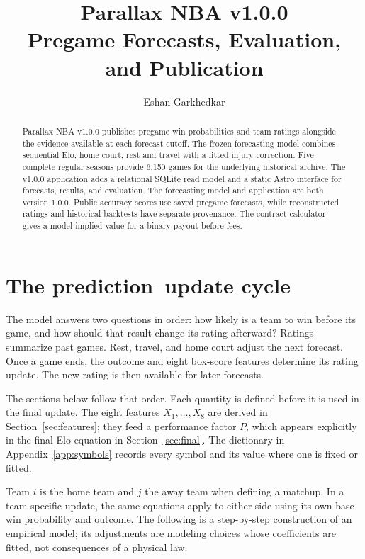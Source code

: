 \documentclass[11pt]{article}
\title{Parallax NBA v1.0.0\\
\large Pregame Forecasts, Evaluation, and Publication}
\author{Eshan Garkhedkar}
\date{}
\begin{document}
\maketitle
\begin{abstract}
Parallax NBA v1.0.0 publishes pregame win probabilities and team ratings
alongside the evidence available at each forecast cutoff. The frozen
forecasting model combines sequential Elo, home court, rest and travel
with a fitted injury correction. Five complete regular seasons provide
6,150 games for the underlying historical archive. The v1.0.0 application
adds a relational SQLite read model and a static Astro interface for
forecasts, results, and evaluation. The forecasting model and application are both version 1.0.0.
Public accuracy scores use saved pregame forecasts, while reconstructed
ratings and historical backtests have separate provenance. The contract
calculator gives a model-implied value for a binary payout before fees.
\end{abstract}

\section{The prediction--update cycle}
The model answers two questions in order: how likely is a team to win before
its game, and how should that result change its rating afterward? Ratings
summarize past games. Rest, travel, and home court adjust the next forecast.
Once a game ends, the outcome and eight box-score features determine its
rating update. The new rating is then available for later forecasts.

The sections below follow that order. Each quantity is defined before it is
used in the final update. The eight features $X_1,\ldots,X_8$ are derived in
Section~\ref{sec:features}; they feed a performance factor $P$, which appears
explicitly in the final Elo equation in Section~\ref{sec:final}.
The dictionary in Appendix~\ref{app:symbols} records every symbol and its value
where one is fixed or fitted.

Team $i$ is the home team and $j$ the away team when defining a matchup.
In a team-specific update, the same equations apply to either side using its
own base win probability and outcome. The following is a
step-by-step construction of an empirical model; its adjustments are modeling
choices whose coefficients are fitted, not consequences of a physical law.
\end{document}
